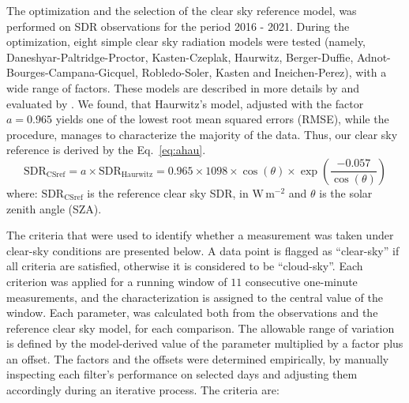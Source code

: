 \documentclass[applsci,article,submit,moreauthors,pdftex]{Definitions/mdpi}
\begin{document}
The optimization and the selection of the clear sky reference model, was
performed on SDR observations for the period 2016 - 2021. During the
optimization, eight simple clear sky radiation models were tested
(namely, Daneshyar-Paltridge-Proctor, Kasten-Czeplak, Haurwitz,
Berger-Duffie, Adnot-Bourges-Campana-Gicquel, Robledo-Soler, Kasten and
Ineichen-Perez), with a wide range of factors. These models are
described in more details by \citet{Reno2012} and evaluated by
\citet{Reno2016}. We found, that Haurwitz's model, adjusted with the
factor \(a = 0.965\) yields one of the lowest root mean squared errors
(RMSE), while the procedure, manages to characterize the majority of the
data. Thus, our clear sky reference is derived by the Eq.~\ref{eq:ahau}.
\begin{equation}
\text{SDR}_\text{CSref} = a \times \text{SDR}_\text{Haurwitz} = 0.965 \times 1098 \times \cos(\theta) \times \exp \left( \frac{ - 0.057}{\cos(\theta)} \right) \label{eq:ahau}
\end{equation} where: \(\text{SDR}_\text{CSref}\) is the reference clear
sky SDR, in \(\text{W}\,\text{m}^{-2}\) and \(\theta\) is the solar
zenith angle (SZA).

The criteria that were used to identify whether a measurement was taken
under clear-sky conditions are presented below. A data point is flagged
as ``clear-sky'' if all criteria are satisfied, otherwise it is
considered to be ``cloud-sky''. Each criterion was applied for a running
window of \(11\) consecutive one-minute measurements, and the
characterization is assigned to the central value of the window. Each
parameter, was calculated both from the observations and the reference
clear sky model, for each comparison. The allowable range of variation
is defined by the model-derived value of the parameter multiplied by a
factor plus an offset. The factors and the offsets were determined
empirically, by manually inspecting each filter's performance on
selected days and adjusting them accordingly during an iterative
process. The criteria are:
\end{document}
